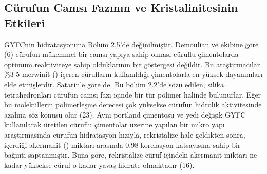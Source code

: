 \documentclass[12pt]{article}
\begin{document}
\subsection{Cürufun Camsı Fazının ve Kristalinitesinin Etkileri}
GYFCnin hidratasyonuna Bölüm 2.5’de değinilmiştir. Demoulian ve
ekibine göre (6) cürufun mükemmel bir camsı yapıya sahip olması cüruflu
çimentolarda optimum reaktiviteye sahip olduklarının bir göstergesi değildir.
Bu araştırmacılar \%3-5 merwinit () içeren cürufların kullanıldığı
çimentolarla en yüksek dayanımları elde etmişlerdir.
Satarin’e göre de, Bu bölüm 2.2’de sözü edilen, silika tetrahedronları cürufun
camsı fazı içinde bir tür polimer halinde bulunurlar. Eğer bu moleküllerin
polimerleşme derecesi çok yüksekse cürufun hidrolik aktivitesinde azalma
söz konusu olur (23).
Aynı portland çimentosu ve yedi değişik GYFC kullanılarak üretilen cüruflu
çimentolar üzerine yapılan bir mikro yapı araştırmasında cürufun hidratasyon
hızıyla, rekristalize hale geldikten sonra, içerdiği akermanit () miktarı
arasında 0.98 korelasyon katsayısına sahip bir bağıntı saptanmıştır. Buna
göre, rekristalize cüruf içindeki akermanit miktarı ne kadar yüksekse cüruf o
kadar yavaş hidrate olmaktadır (16).
\end{document}
